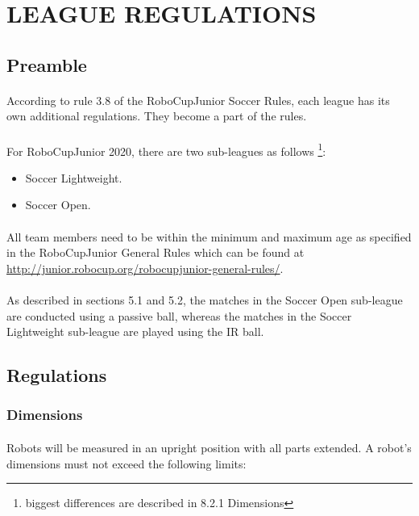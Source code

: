 \documentclass{article}
\newcommand*{\p}{\paragraph{}}
\begin{document}
\section{LEAGUE REGULATIONS \label{section:league_regulations}}

\subsection{ Preamble \label{ref-053}}

\p According to rule 3.8 of the RoboCupJunior Soccer Rules, each league has its
own additional regulations. They become a part of the rules.

\p For RoboCupJunior 2020, there are two sub-leagues as follows
\footnote{biggest differences are described in 8.2.1 Dimensions}:

\begin{itemize}

\item Soccer Lightweight.

\item Soccer Open.

\end{itemize}

\p All team members need to be within the minimum and maximum age as specified
in the RoboCupJunior General Rules which can be found at
\url{http://junior.robocup.org/robocupjunior-general-rules/}.

\p As described in sections 5.1 and 5.2, the matches in the Soccer Open sub-league
are conducted using a passive ball, whereas the matches in the Soccer
Lightweight sub-league are played using the IR ball.

\subsection{Regulations \label{ref-054}}

\subsubsection{Dimensions \label{ref-055}}

\p Robots will be measured in an upright position with all parts extended. A
robot's dimensions must not exceed the following limits:
\end{document}
